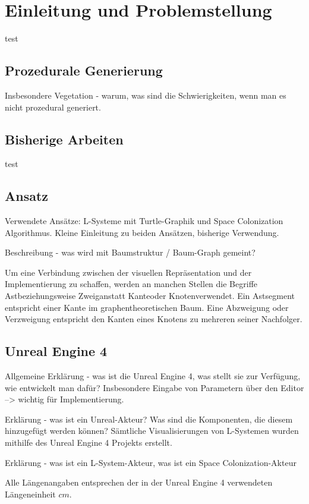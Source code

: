 \chapter{Einleitung und Problemstellung}
test
\section{Prozedurale Generierung}

Insbesondere Vegetation - warum, was sind die Schwierigkeiten, wenn man es nicht prozedural generiert.

\section{Bisherige Arbeiten}

test

\section{Ansatz}
Verwendete Ansätze: L-Systeme mit Turtle-Graphik und Space Colonization Algorithmus. Kleine Einleitung zu beiden Ansätzen, bisherige Verwendung.

Beschreibung - was wird mit Baumstruktur / Baum-Graph gemeint?

Um eine Verbindung zwischen der visuellen Repräsentation und der Implementierung zu schaffen, werden an manchen Stellen die Begriffe \glqq Ast\grqq beziehungsweise \glqq Zweig\grqq anstatt \glqq Kante\grqq oder \glqq Knoten\grqq verwendet. Ein Astsegment entspricht einer Kante im graphentheoretischen Baum. Eine Abzweigung oder Verzweigung entspricht den Kanten eines Knotens zu mehreren seiner Nachfolger.

\section{Unreal Engine 4}

Allgemeine Erklärung - was ist die Unreal Engine 4, was stellt sie zur Verfügung, wie entwickelt man dafür? Insbesondere Eingabe von Parametern über den Editor --> wichtig für Implementierung.

Erklärung - was ist ein Unreal-Akteur? Was sind die Komponenten, die diesem hinzugefügt werden können?
Sämtliche Visualisierungen von L-Systemen wurden mithilfe des Unreal Engine 4 Projekts erstellt.

Erklärung - was ist ein L-System-Akteur, was ist ein Space Colonization-Akteur

Alle Längenangaben entsprechen der in der Unreal Engine 4 verwendeten Längeneinheit $cm$.